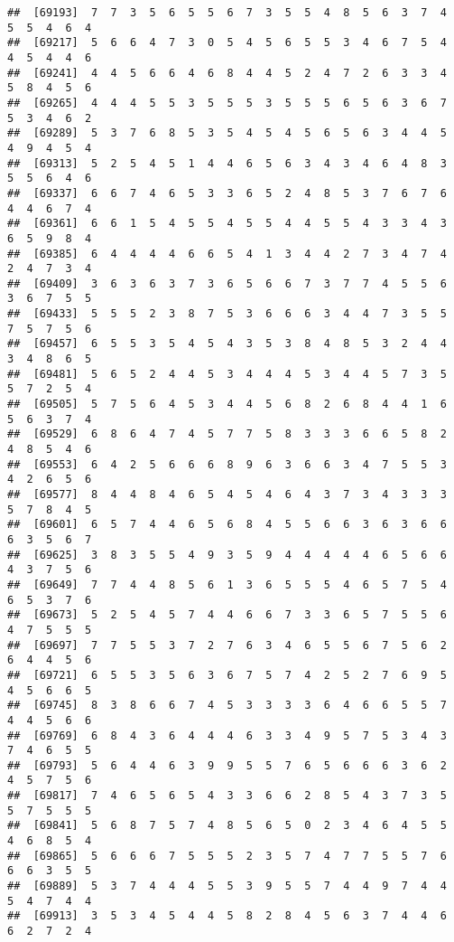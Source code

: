 \documentclass[
]{book}
\begin{document}
\begin{verbatim}
##  [69193]  7  7  3  5  6  5  5  6  7  3  5  5  4  8  5  6  3  7  4  5  5  4  6  4
##  [69217]  5  6  6  4  7  3  0  5  4  5  6  5  5  3  4  6  7  5  4  4  5  4  4  6
##  [69241]  4  4  5  6  6  4  6  8  4  4  5  2  4  7  2  6  3  3  4  5  8  4  5  6
##  [69265]  4  4  4  5  5  3  5  5  5  3  5  5  5  6  5  6  3  6  7  5  3  4  6  2
##  [69289]  5  3  7  6  8  5  3  5  4  5  4  5  6  5  6  3  4  4  5  4  9  4  5  4
##  [69313]  5  2  5  4  5  1  4  4  6  5  6  3  4  3  4  6  4  8  3  5  5  6  4  6
##  [69337]  6  6  7  4  6  5  3  3  6  5  2  4  8  5  3  7  6  7  6  4  4  6  7  4
##  [69361]  6  6  1  5  4  5  5  4  5  5  4  4  5  5  4  3  3  4  3  6  5  9  8  4
##  [69385]  6  4  4  4  4  6  6  5  4  1  3  4  4  2  7  3  4  7  4  2  4  7  3  4
##  [69409]  3  6  3  6  3  7  3  6  5  6  6  7  3  7  7  4  5  5  6  3  6  7  5  5
##  [69433]  5  5  5  2  3  8  7  5  3  6  6  6  3  4  4  7  3  5  5  7  5  7  5  6
##  [69457]  6  5  5  3  5  4  5  4  3  5  3  8  4  8  5  3  2  4  4  3  4  8  6  5
##  [69481]  5  6  5  2  4  4  5  3  4  4  4  5  3  4  4  5  7  3  5  5  7  2  5  4
##  [69505]  5  7  5  6  4  5  3  4  4  5  6  8  2  6  8  4  4  1  6  5  6  3  7  4
##  [69529]  6  8  6  4  7  4  5  7  7  5  8  3  3  3  6  6  5  8  2  4  8  5  4  6
##  [69553]  6  4  2  5  6  6  6  8  9  6  3  6  6  3  4  7  5  5  3  4  2  6  5  6
##  [69577]  8  4  4  8  4  6  5  4  5  4  6  4  3  7  3  4  3  3  3  5  7  8  4  5
##  [69601]  6  5  7  4  4  6  5  6  8  4  5  5  6  6  3  6  3  6  6  6  3  5  6  7
##  [69625]  3  8  3  5  5  4  9  3  5  9  4  4  4  4  4  6  5  6  6  4  3  7  5  6
##  [69649]  7  7  4  4  8  5  6  1  3  6  5  5  5  4  6  5  7  5  4  6  5  3  7  6
##  [69673]  5  2  5  4  5  7  4  4  6  6  7  3  3  6  5  7  5  5  6  4  7  5  5  5
##  [69697]  7  7  5  5  3  7  2  7  6  3  4  6  5  5  6  7  5  6  2  6  4  4  5  6
##  [69721]  6  5  5  3  5  6  3  6  7  5  7  4  2  5  2  7  6  9  5  4  5  6  6  5
##  [69745]  8  3  8  6  6  7  4  5  3  3  3  3  6  4  6  6  5  5  7  4  4  5  6  6
##  [69769]  6  8  4  3  6  4  4  4  6  3  3  4  9  5  7  5  3  4  3  7  4  6  5  5
##  [69793]  5  6  4  4  6  3  9  9  5  5  7  6  5  6  6  6  3  6  2  4  5  7  5  6
##  [69817]  7  4  6  5  6  5  4  3  3  6  6  2  8  5  4  3  7  3  5  5  7  5  5  5
##  [69841]  5  6  8  7  5  7  4  8  5  6  5  0  2  3  4  6  4  5  5  4  6  8  5  4
##  [69865]  5  6  6  6  7  5  5  5  2  3  5  7  4  7  7  5  5  7  6  6  6  3  5  5
##  [69889]  5  3  7  4  4  4  5  5  3  9  5  5  7  4  4  9  7  4  4  5  4  7  4  4
##  [69913]  3  5  3  4  5  4  4  5  8  2  8  4  5  6  3  7  4  4  6  6  2  7  2  4

\end{verbatim}
\end{document}
